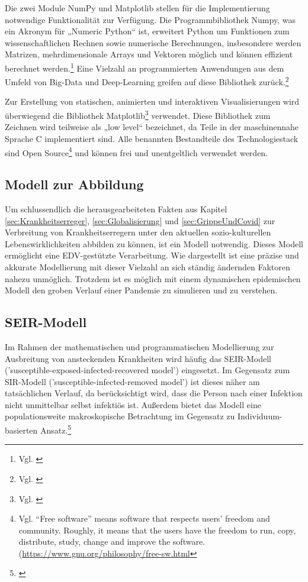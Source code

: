 \documentclass[12pt]{article}
\begin{document}
Die zwei Module NumPy und Matplotlib stellen für die Implementierung notwendige Funktionalität zur Verfügung. Die Programmbibliothek Numpy, was ein Akronym für „Numeric Python“ ist, erweitert Python um Funktionen zum wissenschaftlichen Rechnen sowie numerische Berechnungen, insbesondere werden Matrizen, mehrdimensionale Arrays und Vektoren möglich und können effizient berechnet werden.\footnote{Vgl. \cite{numpy}} Eine Vielzahl an programmierten Anwendungen aus dem Umfeld von Big-Data und Deep-Learning greifen auf diese Bibliothek zurück.\footnote{Vgl. \cite{bigdata}}

Zur Erstellung von statischen, animierten und interaktiven Visualisierungen wird überwiegend die Bibliothek Matplotlib\footnote{Vgl. \cite{matplotlib}} verwendet. Diese Bibliothek zum Zeichnen wird teilweise als „low level“ bezeichnet, da Teile in der maschinennahe Sprache C implementiert sind. Alle benannten Bestandteile des Technologiestack sind Open Source\footnote{Vgl. “Free software” means software that respects users' freedom and community. Roughly, it means that the users have the freedom to run, copy, distribute, study, change and improve the software. (\url{https://www.gnu.org/philosophy/free-sw.html}} und können frei und unentgeltlich verwendet werden.

\subsection{Modell zur Abbildung}
Um schlussendlich die herausgearbeiteten Fakten aus Kapitel \ref{sec:Krankheitserreger}, \ref{sec:Globalisierung} und \ref{sec:GrippeUndCovid} zur Verbreitung von Krankheitserregern unter den aktuellen sozio-kulturellen Lebenswirklichkeiten abbilden zu können, ist ein Modell notwendig. Dieses Modell ermöglicht eine EDV-gestützte Verarbeitung. Wie dargestellt ist eine präzise und akkurate Modellierung mit dieser Vielzahl an sich ständig ändernden Faktoren nahezu unmöglich. Trotzdem ist es möglich mit einem dynamischen epidemischen Modell den groben Verlauf einer Pandemie zu simulieren und zu verstehen.

\subsection{SEIR-Modell}
Im Rahmen der mathematischen und programmatischen Modellierung zur Ausbreitung von ansteckenden Krankheiten wird häufig das SEIR-Modell ('susceptible-exposed-infected-recovered model') eingesetzt. Im Gegensatz zum SIR-Modell ('susceptible-infected-removed model') ist dieses näher am tatsächlichen Verlauf, da berücksichtigt wird, dass die Person nach einer Infektion nicht unmittelbar selbst infektiös ist. Außerdem bietet das Modell eine populationsweite makroskopische Betrachtung im Gegensatz zu Individuum-basierten Ansatz.\footnote{\cite{SEIR}}
\end{document}
